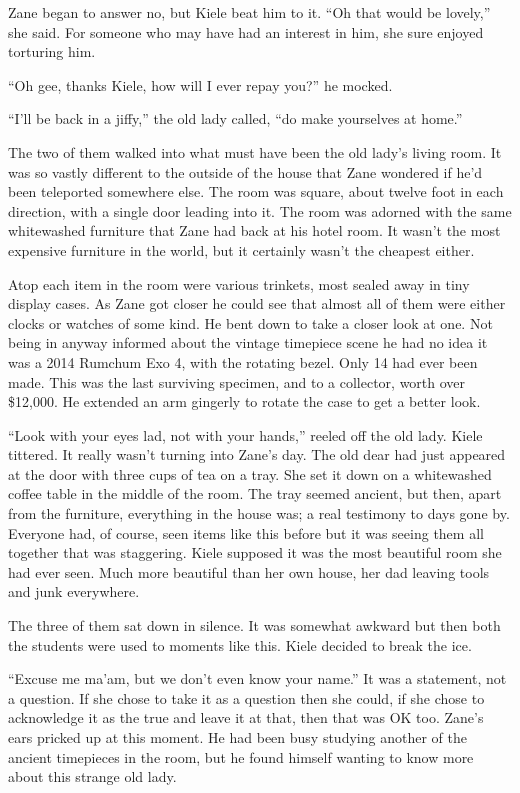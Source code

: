 Zane began to answer no, but Kiele beat him to it.  ``Oh that would be lovely,'' she said.  For someone who may have had an interest in him, she sure enjoyed torturing him.

``Oh gee, thanks Kiele, how will I ever repay you?'' he mocked.

``I'll be back in a jiffy,'' the old lady called, ``do make yourselves at home.''

The two of them walked into what must have been the old lady's living room.  It was so vastly different to the outside of the house that Zane wondered if he'd been teleported somewhere else.  The room was square, about twelve foot in each direction, with a single door leading into it.  The room was adorned with the same whitewashed furniture that Zane had back at his hotel room.  It wasn't the most expensive furniture in the world, but it certainly wasn't the cheapest either.

Atop each item in the room were various trinkets, most sealed away in tiny display cases.  As Zane got closer he could see that almost all of them were either clocks or watches of some kind.  He bent down to take a closer look at one.  Not being in anyway informed about the vintage timepiece scene he had no idea it was a 2014 Rumchum Exo 4, with the rotating bezel.  Only 14 had ever been made.  This was the last surviving specimen, and to a collector, worth over \$12,000.  He extended an arm gingerly to rotate the case to get a better look.

``Look with your eyes lad, not with your hands,'' reeled off the old lady.  Kiele tittered.  It really wasn't turning into Zane's day.  The old dear had just appeared at the door with three cups of tea on a tray.  She set it down on a whitewashed coffee table in the middle of the room.  The tray seemed ancient, but then, apart from the furniture, everything in the house was; a real testimony to days gone by.  Everyone had, of course, seen items like this before but it was seeing them all together that was staggering.  Kiele supposed it was the most beautiful room she had ever seen.  Much more beautiful than her own house, her dad leaving tools and junk everywhere.  

The three of them sat down in silence.  It was somewhat awkward but then both the students were used to moments like this.  Kiele decided to break the ice.

``Excuse me ma'am, but we don't even know your name.''  It was a statement, not a question.  If she chose to take it as a question then she could, if she chose to acknowledge it as the true and leave it at that, then that was OK too.  Zane's ears pricked up at this moment.  He had been busy studying another of the ancient timepieces in the room, but he found himself wanting to know more about this strange old lady.  

